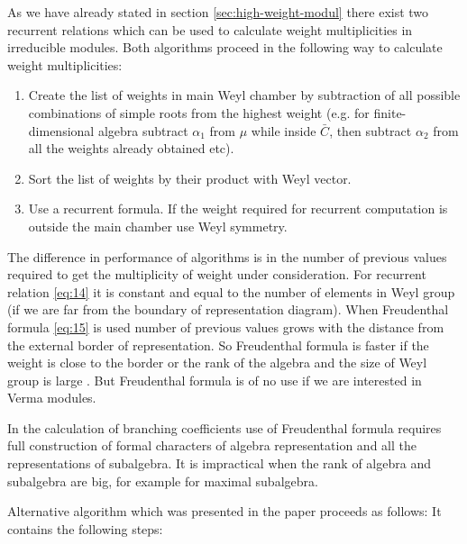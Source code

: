 \documentclass[preprint,12pt]{elsarticle}
\begin{document}
As we have already stated in section \ref{sec:high-weight-modul} there exist two recurrent relations which can be used to calculate weight multiplicities in irreducible modules. Both algorithms proceed in the following way to calculate weight multiplicities:
\begin{enumerate}
\item Create the list of weights in main Weyl chamber by subtraction of all possible combinations of simple roots from the highest weight (e.g. for finite-dimensional algebra subtract $\alpha_{1}$ from $\mu$ while inside $\bar C$, then subtract $\alpha_{2}$ from all the weights already obtained etc).
\item Sort the list of weights by their product with Weyl vector.
\item Use a recurrent formula. If the weight required for recurrent computation is outside the main chamber use Weyl symmetry.
\end{enumerate}
The difference in performance of algorithms is in the number of previous values required to get the multiplicity of weight under consideration. For recurrent relation \eqref{eq:14} it is constant and equal to the number of elements in Weyl group (if we are far from the boundary of representation diagram). When Freudenthal formula \eqref{eq:15} is used number of previous values grows with the distance from the external border of representation. So Freudenthal formula is faster if the weight is close to the border or the rank of the algebra and the size of Weyl group is large \cite{moody1982fast}.
But Freudenthal formula is of no use if we are interested in Verma modules.

In the calculation of branching coefficients use of Freudenthal formula requires full construction of formal characters of algebra representation and all the representations of subalgebra. It is impractical when the rank of algebra and subalgebra are big, for example for maximal subalgebra.

Alternative algorithm which was presented in the paper \cite{2010arXiv1007.0318L} proceeds as follows:
It contains the following steps:
\end{document}
